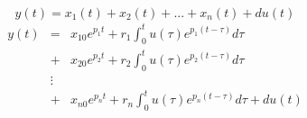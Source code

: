 \[ y(t) = x_1(t) + x_2(t) + ... + x_n(t) + du(t) \]
\begin{eqnarray*}
	y(t) & = & x_{10}e^{p_1t}+r_1\int_0^tu(\tau)e^{p_1(t-\tau)}d\tau  \\
         & + &	x_{20}e^{p_2t}+r_2\int_0^tu(\tau)e^{p_2(t-\tau)}d\tau \\
	     & \vdots & \\
	     & + & x_{n0}e^{p_nt}+r_n\int_0^tu(\tau)e^{p_n(t-\tau)}d\tau + du(t)
\end{eqnarray*}

\endinput

